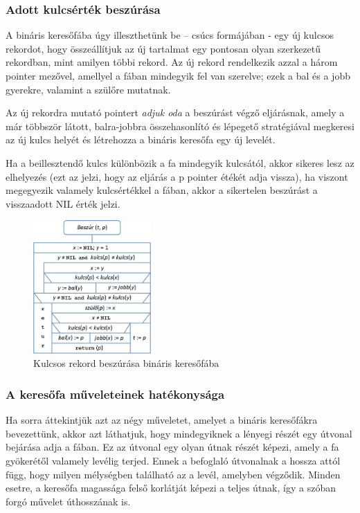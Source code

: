 \documentclass[12pt,margin=0px]{article}
\begin{document}
    \subsubsection*{Adott kulcsérték beszúrása}

    \noindent A bináris keresőfába úgy illeszthetünk be – csúcs formájában - egy új kulcsos rekordot, hogy összeállítjuk az új tartalmat egy pontosan olyan szerkezetű rekordban, mint amilyen többi rekord. Az új rekord rendelkezik azzal a három pointer mezővel, amellyel a fában mindegyik fel van szerelve; ezek a bal és a jobb gyerekre, valamint a szülőre mutatnak.

    \noindent Az új rekordra mutató pointert \emph{adjuk oda} a beszúrást végző eljárásnak, amely a már többször látott, balra-jobbra összehasonlító és lépegető stratégiával megkeresi az új kulcs helyét és létrehozza a bináris keresőfa egy új levelét.

    Ha a beillesztendő kulcs különbözik a fa mindegyik kulcsától, akkor sikeres lesz az elhelyezés (ezt az jelzi, hogy az eljárás a p pointer étékét adja vissza), ha viszont megegyezik valamely kulcsértékkel a fában, akkor a sikertelen beszúrást a visszaadott NIL érték jelzi.

	\begin{figure}[H]
		\centering
		\includegraphics[width=0.40\textwidth]{img/btree_insert.png}
		\caption{Kulcsos rekord beszúrása bináris keresőfába}
	\end{figure}

    \subsubsection*{A keresőfa műveleteinek hatékonysága}

    Ha sorra áttekintjük azt az négy műveletet, amelyet a bináris keresőfákra bevezettünk, akkor azt láthatjuk, hogy mindegyiknek a lényegi részét egy útvonal bejárása adja a fában. Ez az útvonal egy olyan útnak részét képezi, amely a fa gyökerétől valamely levélig terjed. Ennek a befoglaló útvonalnak a hossza attól függ, hogy milyen mélységben található az a levél, amelyben végződik. Minden esetre, a keresőfa magassága felső korlátját képezi a teljes útnak, így a szóban forgó művelet úthosszának is.\\
\end{document}
